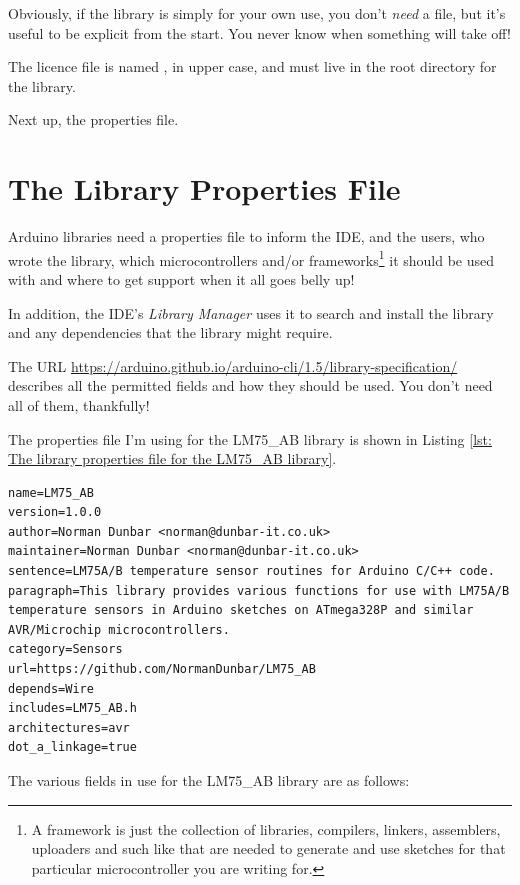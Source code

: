 Obviously, if the library is simply for your own use, you don't \emph{need} a  file, but it's useful to be explicit from the start. You never know when something will take off!

The licence file is named , in upper case, and must live in the root directory for the library.

Next up, the properties file.

\section{The Library Properties File}

Arduino libraries need a properties file to inform the IDE, and the users, who wrote the library, which microcontrollers and/or frameworks\footnote{A framework is just the collection of libraries, compilers, linkers, assemblers, uploaders and such like that are needed to generate and use sketches for that particular microcontroller you are writing for.} it should be used with and where to get support when it all goes belly up!

In addition, the IDE's \emph{Library Manager} uses it to search and install the library and any dependencies that the library might require.

The URL \url{https://arduino.github.io/arduino-cli/1.5/library-specification/} describes all the permitted fields and how they should be used. You don't need all of them, thankfully!

The properties file I'm using for the LM75\_AB library is shown in Listing \ref{lst: The library properties file for the LM75_AB library}.

\begin{lstlisting}[caption={The \texttt{library.properties} file for the LM75\_AB library.},label={lst: The library properties file for the LM75_AB library}]
name=LM75_AB
version=1.0.0
author=Norman Dunbar <norman@dunbar-it.co.uk>
maintainer=Norman Dunbar <norman@dunbar-it.co.uk>
sentence=LM75A/B temperature sensor routines for Arduino C/C++ code.
paragraph=This library provides various functions for use with LM75A/B temperature sensors in Arduino sketches on ATmega328P and similar AVR/Microchip microcontrollers.
category=Sensors
url=https://github.com/NormanDunbar/LM75_AB
depends=Wire
includes=LM75_AB.h
architectures=avr
dot_a_linkage=true
\end{lstlisting}

The various fields in use for the LM75\_AB library are as follows:

